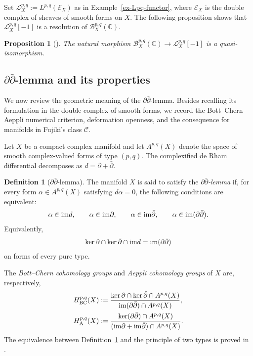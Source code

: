 \documentclass[11pt]{amsart}
\numberwithin{equation}{section}
\def\mc{\mathcal}
\def\im{{\rm im}}
\theoremstyle{plain}
\newtheorem{Pro}[thm]{Proposition}
\theoremstyle{definition}
\newtheorem{defn}[thm]{Definition}
\begin{document}
Set $\mathcal L_X^{p,q}:=L^{p,q}(\mathcal E_X)$ as in  Example~\ref{ex-Lpq-functor},
where $\mathcal E_X$ is the double complex of sheaves of smooth forms on $X$.
The following proposition shows that
$\mathcal L_X^{p,q}[-1]$ is a resolution of
$\mathcal{B}_X^{p,q}(\mathbb C)$.

\begin{Pro}[{\cite[Propositions~4.2--4.4]{Sch}}]
The natural morphism
$\mathcal{B}_X^{p,q}(\mathbb C)\longrightarrow\mathcal L_X^{p,q}[-1]$ is a
quasi-isomorphism.
\end{Pro}




\subsection{\texorpdfstring{$\partial\bar\partial$}{partial-bar-partial}-lemma and its properties}
We now review the geometric meaning of the
$\partial\bar\partial$-lemma.  Besides recalling its formulation in the
double complex of smooth forms, we record the Bott--Chern--Aeppli numerical
criterion, deformation openness, and the consequence for manifolds in
Fujiki's class $\mc C$.

Let $X$ be a compact complex manifold and let $A^{p,q}(X)$ denote the space of
smooth complex-valued forms of type $(p,q)$.  The complexified de Rham
differential decomposes as $d=\partial+\bar\partial$.

\begin{defn}[$\partial\bar\partial$-lemma]\label{def-ddbar}
The manifold $X$ is said to satisfy the
\emph{$\partial\bar\partial$-lemma} if, for
every form $\alpha\in A^{p,q}(X)$ satisfying $d\alpha=0$, the following
conditions are equivalent:
\begin{equation*}%
 \alpha\in\im d,\qquad
 \alpha\in\im\partial,\qquad
 \alpha\in\im\bar\partial,\qquad
 \alpha\in\im(\partial\bar\partial).
\end{equation*}
Equivalently,
\begin{equation*}%
 \ker\partial\cap\ker\bar\partial\cap\im d
 =\im(\partial\bar\partial)
\end{equation*}
on forms of every pure type.
\end{defn}

The \emph{Bott--Chern cohomology groups} and
\emph{Aeppli cohomology groups} of $X$ are, respectively,
\begin{align*}
 H_{\mathrm{BC}}^{p,q}(X)
 &:=\frac{\ker\partial\cap\ker\bar\partial\cap A^{p,q}(X)}
 {\im(\partial\bar\partial)\cap A^{p,q}(X)},%
\\
 H_{\mathrm A}^{p,q}(X)
 &:=\frac{\ker(\partial\bar\partial)\cap A^{p,q}(X)}
 {(\im\partial+\im\bar\partial)\cap A^{p,q}(X)}.%
\end{align*}
The equivalence between Definition~\ref{def-ddbar} and the principle of two
types is proved in \cite[Proposition 5.17 and (5.21)]{DGMS75}.
\end{document}
